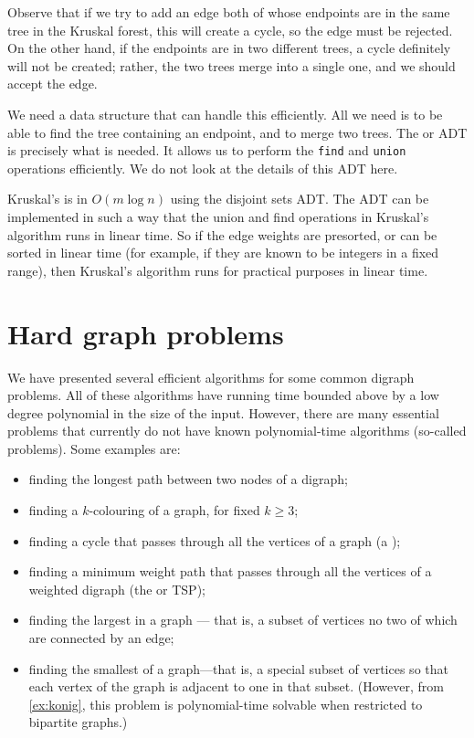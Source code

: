 Observe that if we try to add an edge both of whose endpoints are in
the same tree in the Kruskal forest, this will create a cycle, so the
edge must be rejected. On the other hand, if the endpoints are in two
different trees, a cycle definitely will not be created; rather, the two
trees merge into a single one, and we should accept the edge. 

We need a data structure that can handle this efficiently. All we need is to be
able to find the tree containing an endpoint, and to merge two trees. The
 or  ADT is precisely what
is needed. It allows us to perform the \texttt{find} and \texttt{union}
operations efficiently. We do not look at the details of this ADT here.



Kruskal's is in $O(m \log n)$ using the disjoint sets
ADT. The ADT can be implemented in such a way that the union and find operations
in Kruskal's algorithm runs in  linear time. So if the edge weights are presorted, or can be
sorted in linear time (for example, if they are known to be integers in
a fixed range), then Kruskal's algorithm runs for practical purposes in
linear time.



\chapter{Hard graph problems}%
\label{sec:hardgraph}
We have presented several efficient algorithms for some common digraph
problems. All of these algorithms have running time bounded above by a low
degree polynomial in the size of the input. However, there are many
essential problems that currently do not have known polynomial-time
algorithms (so-called  problems). Some examples
are:
\begin{itemize}
\item finding the longest path between two nodes of a digraph;
\item finding a $k$-colouring of a graph, for fixed $k \geq 3$;
\item finding a cycle that passes through all the vertices of
a graph (a );
\item finding a
minimum weight path that passes through all the vertices of a weighted
digraph (the  or TSP);
\item finding the largest  in a graph --- that is, 
a subset of vertices no two of which are connected by an edge;
\item finding the smallest  of a graph---that is, a special subset of
vertices so that each vertex of the graph is adjacent to one in that
subset. (However, from \cref{ex:konig}, this problem 
is polynomial-time solvable when restricted to bipartite graphs.)
\end{itemize}

